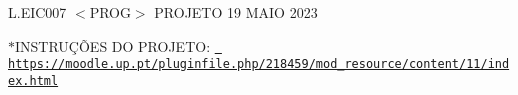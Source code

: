 L.\+EIC007 $<$\+PROG$>$ PROJETO 19 MAIO 2023

$\ast$\+INSTRUÇÕ\+ES DO PROJETO\+: \href{https://moodle.up.pt/pluginfile.php/218459/mod_resource/content/11/index.html}{\texttt{ https\+://moodle.\+up.\+pt/pluginfile.\+php/218459/mod\+\_\+resource/content/11/index.\+html}} 